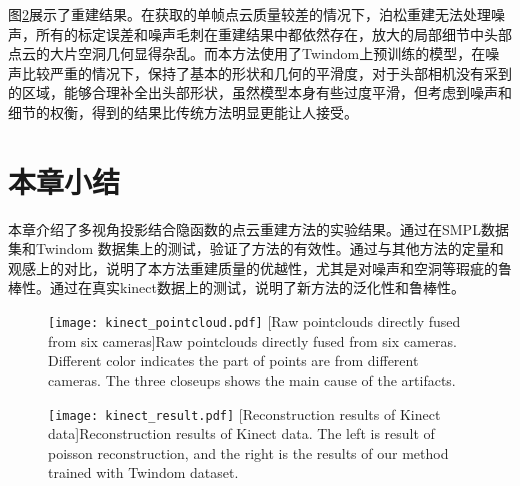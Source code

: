 图\ref{fig:pc_kinect_result}展示了重建结果。在获取的单帧点云质量较差的情况下，泊松重建无法处理噪声，所有的标定误差和噪声毛刺在重建结果中都依然存在，放大的局部细节中头部点云的大片空洞几何显得杂乱。而本方法使用了Twindom上预训练的模型，在噪声比较严重的情况下，保持了基本的形状和几何的平滑度，对于头部相机没有采到的区域，能够合理补全出头部形状，虽然模型本身有些过度平滑，但考虑到噪声和细节的权衡，得到的结果比传统方法明显更能让人接受。

\section{本章小结}

本章介绍了多视角投影结合隐函数的点云重建方法的实验结果。通过在SMPL数据集和Twindom 数据集上的测试，验证了方法的有效性。通过与其他方法的定量和观感上的对比，说明了本方法重建质量的优越性，尤其是对噪声和空洞等瑕疵的鲁棒性。通过在真实kinect数据上的测试，说明了新方法的泛化性和鲁棒性。

\begin{figure}[!htbp]
    \centering
    \texttt{[image: kinect\_pointcloud.pdf]}
    [Raw pointclouds directly fused from six cameras]{Raw pointclouds directly fused from six cameras. Different color indicates the part of points are from different cameras. The three closeups shows the main cause of the artifacts.}
    \label{fig:pc_kinect_pointcloud}
\end{figure}

\begin{figure}[!htbp]
    \centering
    \texttt{[image: kinect\_result.pdf]}
    [Reconstruction results of Kinect data]{Reconstruction results of Kinect data. The left is result of poisson reconstruction, and the right is the results of our method trained with Twindom dataset.}
    \label{fig:pc_kinect_result}
\end{figure}